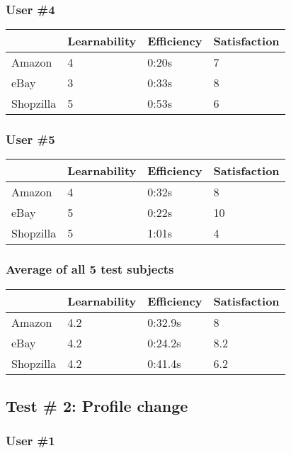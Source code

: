 \documentclass[11pt, oneside]{article}   	%
\begin{document}
\subsubsection{User \#4}

\begin{tabular}{| l | l | l | l |}
    \hline
     & Learnability & Efficiency & Satisfaction \\ \hline
    Amazon & 4 & 0:20s & 7 \\ \hline
    eBay & 3 & 0:33s & 8 \\ \hline
    Shopzilla & 5 & 0:53s & 6 \\\hline
\end{tabular}

\subsubsection{User \#5}

\begin{tabular}{| l | l | l | l |}
    \hline
     & Learnability & Efficiency & Satisfaction \\ \hline
    Amazon & 4 & 0:32s & 8 \\ \hline
    eBay & 5 & 0:22s & 10 \\ \hline
    Shopzilla & 5 & 1:01s & 4 \\\hline
\end{tabular}

\subsubsection{Average of all 5 test subjects}

\begin{tabular}{| l | l | l | l |}
    \hline
     & Learnability & Efficiency & Satisfaction \\ \hline
    Amazon & 4.2 & 0:32.9s & 8 \\ \hline
    eBay & 4.2 & 0:24.2s & 8.2 \\ \hline
    Shopzilla & 4.2 & 0:41.4s & 6.2 \\\hline
\end{tabular}

\subsection{Test \# 2: Profile change}

\subsubsection{User \#1}
\end{document}

